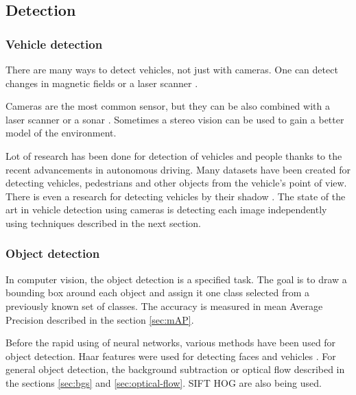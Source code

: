 \documentclass[a4paper,12pt,titlepage]{article}
\numberwithin{figure}{section}
\begin{document}
\subsection{Detection}
\label{sec:detection}
\subsubsection{Vehicle detection}
There are many ways to detect vehicles, not just with cameras. One can detect changes in magnetic fields \cite{daubaras2012vehicle, caruso1999vehicle} or a laser scanner \cite{gate2009fast}.

Cameras are the most common sensor, but they can be also combined with a laser scanner \cite{wender20083d, premebida2007lidar} or a sonar \cite{kim2005front, wang2003online}. Sometimes a stereo vision \cite{bertozzi2000stereo, toulminet2006vehicle} can be used to gain a better model of the environment.

Lot of research has been done for detection of vehicles and people thanks to the recent advancements in autonomous driving. Many datasets have been created \cite{apollo-scape, madhavan2017bdd, RobotCarDatasetIJRR, ncarlevaris-2015a} for detecting vehicles, pedestrians and other objects from the vehicle's point of view. There is even a research for detecting vehicles by their shadow \cite{tzomakas1998vehicle}. The state of the art in vehicle detection using cameras is detecting each image independently using techniques described in the next section.


\subsubsection{Object detection}
\label{sec:object_detection}
In computer vision, the object detection is a specified task. The goal is to draw a bounding box around each object and assign it one class selected from a previously known set of classes. The accuracy is measured in mean Average Precision described in the section \ref{sec:mAP}. 

Before the rapid using of neural networks, various methods have been used for object detection. Haar features were used for detecting faces \cite{haar, lienhart2002extended, viola2004robust} and vehicles \cite{sun2002real}. For general object detection, the background subtraction \cite{piccardi2004background, horprasert1999statistical} or optical flow \cite{naoya1990optical, quenot1992orthogonal, chen2011tracking} described in the sections \ref{sec:bgs} and \ref{sec:optical-flow}. SIFT \cite{lowe2004distinctive} HOG \cite{girshick2014rich, wang2009hog, zhu2006fast, felzenszwalb2010object, dalal2005histograms} are also being used.
\end{document}
